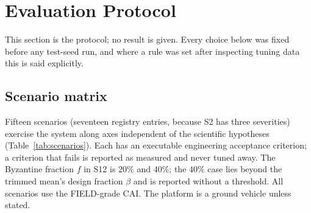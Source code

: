 \documentclass[journal]{IEEEtran}
\begin{document}
\section{Evaluation Protocol}
\label{sec:setup}
This section is the protocol; no result is given. Every choice below was fixed before any test-seed run,
and where a rule was set after inspecting tuning data this is said explicitly.

\subsection{Scenario matrix}
\label{sec:scenarios}
Fifteen scenarios (seventeen registry entries, because S2 has three severities) exercise the system along
axes independent of the scientific hypotheses (Table~\ref{tab:scenarios}). Each has an executable
engineering acceptance criterion; a criterion that fails is reported as measured and never tuned away.
The Byzantine fraction $f$ in S12 is $20\%$ and $40\%$; the $40\%$ case lies beyond the trimmed mean's
design fraction $\beta$ and is reported without a threshold. All scenarios use the FIELD-grade CAI. The
platform is a ground vehicle unless stated.
\end{document}
